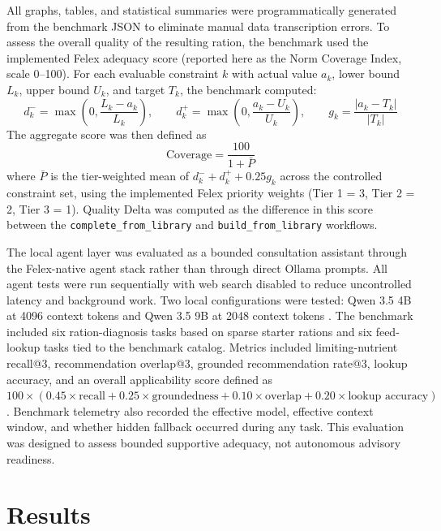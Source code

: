 \documentclass[a4paper,fleqn]{cas-sc}
\begin{document}
All graphs, tables, and statistical summaries were programmatically generated from the benchmark JSON to eliminate manual data transcription errors. To assess the overall quality of the resulting ration, the benchmark used the implemented Felex adequacy score (reported here as the Norm Coverage Index, scale 0--100). For each evaluable constraint $k$ with actual value $a_k$, lower bound $L_k$, upper bound $U_k$, and target $T_k$, the benchmark computed:
\begin{equation}
 d^-_k = \max\left(0, \frac{L_k - a_k}{L_k}\right), \qquad
 d^+_k = \max\left(0, \frac{a_k - U_k}{U_k}\right), \qquad
 g_k = \frac{|a_k - T_k|}{|T_k|}
\end{equation}
The aggregate score was then defined as
\begin{equation}
\text{Coverage} = \frac{100}{1 + \bar{P}}
\end{equation}
where $\bar{P}$ is the tier-weighted mean of $d^-_k + d^+_k + 0.25 g_k$ across the controlled constraint set, using the implemented Felex priority weights (Tier 1 = 3, Tier 2 = 2, Tier 3 = 1). Quality Delta was computed as the difference in this score between the \texttt{complete\_from\_library} and \texttt{build\_from\_library} workflows.

The local agent layer was evaluated as a bounded consultation assistant through the Felex-native agent stack rather than through direct Ollama prompts. All agent tests were run sequentially with web search disabled to reduce uncontrolled latency and background work. Two local configurations were tested: Qwen 3.5 4B at 4096 context tokens and Qwen 3.5 9B at 2048 context tokens \citep{qwen2023, ollama2023}. The benchmark included six ration-diagnosis tasks based on sparse starter rations and six feed-lookup tasks tied to the benchmark catalog. Metrics included limiting-nutrient recall@3, recommendation overlap@3, grounded recommendation rate@3, lookup accuracy, and an overall applicability score defined as $100 \times (0.45 \times \text{recall} + 0.25 \times \text{groundedness} + 0.10 \times \text{overlap} + 0.20 \times \text{lookup accuracy})$. Benchmark telemetry also recorded the effective model, effective context window, and whether hidden fallback occurred during any task. This evaluation was designed to assess bounded supportive adequacy, not autonomous advisory readiness.

\section{Results}\label{sec:results}
\end{document}
